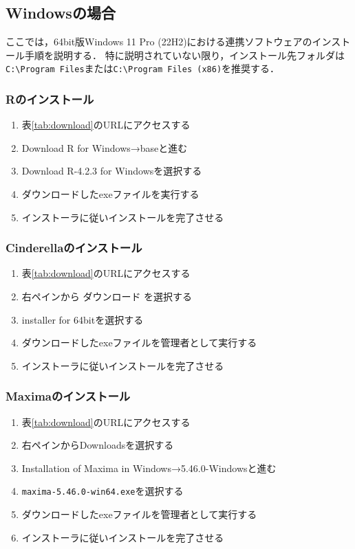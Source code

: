 \subsection{Windowsの場合}

ここでは，64bit版Windows 11 Pro (22H2)における連携ソフトウェアのインストール手順を説明する．
特に説明されていない限り，インストール先フォルダは\verb|C:\Program Files|または\verb|C:\Program Files (x86)|を推奨する．

\subsubsection{Rのインストール}
\begin{enumerate}
    \item 表\ref{tab:download}のURLにアクセスする
    \item Download R for Windows→baseと進む
    \item Download R-4.2.3 for Windowsを選択する
    \item ダウンロードしたexeファイルを実行する
    \item インストーラに従いインストールを完了させる
\end{enumerate}

\subsubsection{Cinderellaのインストール}
\begin{enumerate}
    \item 表\ref{tab:download}のURLにアクセスする
    \item 右ペインから ダウンロード を選択する
    \item installer for 64bitを選択する
    \item ダウンロードしたexeファイルを管理者として実行する
    \item インストーラに従いインストールを完了させる
\end{enumerate}

\newpage

\subsubsection{Maximaのインストール}
\begin{enumerate}
    \item 表\ref{tab:download}のURLにアクセスする
    \item 右ペインからDownloadsを選択する
    \item Installation of Maxima in Windows→5.46.0-Windowsと進む
    \item \verb|maxima-5.46.0-win64.exe|を選択する
    \item ダウンロードしたexeファイルを管理者として実行する
    \item インストーラに従いインストールを完了させる
\end{enumerate}

